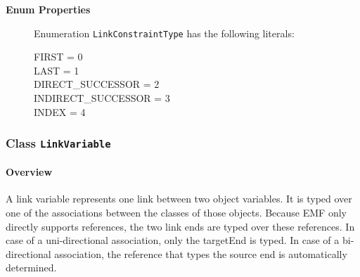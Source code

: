 \begin{description}

	\item[\textbf{Enum Properties}] Enumeration \texttt{LinkConstraintType} has the following literals:

	\begin{description}
		
		\item[FIRST = 0]
		\hspace{\fill}
		\nopagebreak

		\item[LAST = 1]
		\hspace{\fill}
		\nopagebreak

		\item[DIRECT\_SUCCESSOR = 2]
		\hspace{\fill}
		\nopagebreak

		\item[INDIRECT\_SUCCESSOR = 3]
		\hspace{\fill}
		\nopagebreak

		\item[INDEX = 4]
		\hspace{\fill}
		\nopagebreak
 
	\end{description}

\end{description}



\subsubsection{\Large{Class \bfseries \texttt{LinkVariable}\normalfont}}
\label{cls:modeling::patterns::LinkVariable} 
\paragraph{Overview}

	
			
A link variable represents one link between two object variables. It is typed over one of the associations between the classes of those objects. Because EMF only directly supports references, the two link ends are typed over these references. In case of a uni-directional association, only the targetEnd is typed. In case of a bi-directional association, the reference that types the source end is automatically determined.	
		
	



